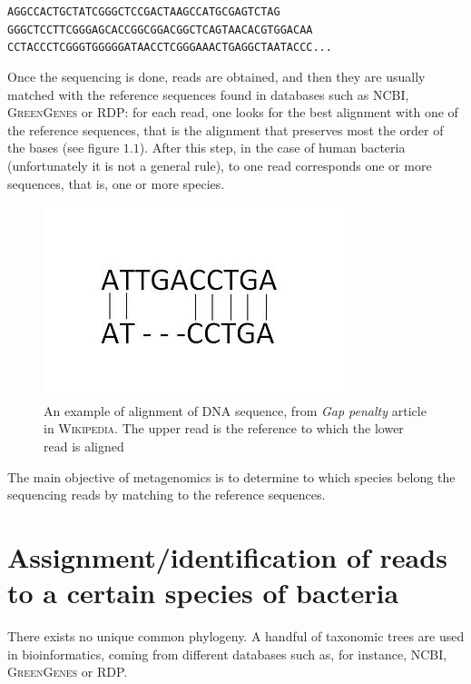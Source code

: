 \documentclass{report}
\begin{document}
\begin{center}
{\tt AGGCCACTGCTATCGGGCTCCGACTAAGCCATGCGAGTCTAG\\
GGGCTCCTTCGGGAGCACCGGCGGACGGCTCAGTAACACGTGGACAA\\
CCTACCCTCGGGTGGGGGATAACCTCGGGAAACTGAGGCTAATACCC...}\\
\end{center}

Once the sequencing is done, reads are obtained, and then they are usually matched with the reference sequences found in databases such as NCBI, \textsc{GreenGenes} or RDP: for each read, one looks for the best alignment with one of the reference sequences, that is the alignment that preserves most the order of the bases (see figure $1.1$). After this step, in the case of human bacteria (unfortunately it is not a general rule), to one read corresponds one or more sequences, that is, one or more species.\\

\begin{figure}[H]
\centering
\includegraphics[scale=0.5]{illustrations/Sequence_gaps.JPG}
\caption{An example of alignment of DNA sequence, from \emph{Gap penalty} article in \textsc{Wikipedia}. The upper read is the reference to which the lower read is aligned}
\end{figure}

The main objective of metagenomics is to determine to which species belong the sequencing reads by matching to the reference sequences.

\section{Assignment/identification of reads to a certain species of bacteria}

There exists no unique common phylogeny. A handful of taxonomic trees are used in bioinformatics, coming from different databases such as, for instance, NCBI, \textsc{GreenGenes} or RDP.\\
\end{document}
